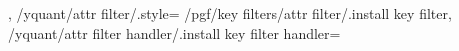 {{{            %
         \else%
            \ifnum{} %
                  \pgfkeysfiltercontinuetrue%
                  \pgfkeysfiltercontinuefalse%
            \else%
               \pgfkeysfiltercontinuetrue%
            \fi%
         \fi%
      }\relax%
   },%
   /yquant/attr filter/.style={%
      /pgf/key filters/attr filter/.install key filter,%
      /yquant/attr filter handler/.install key filter handler=\yquant@attrs@remaining%
   }%
}

